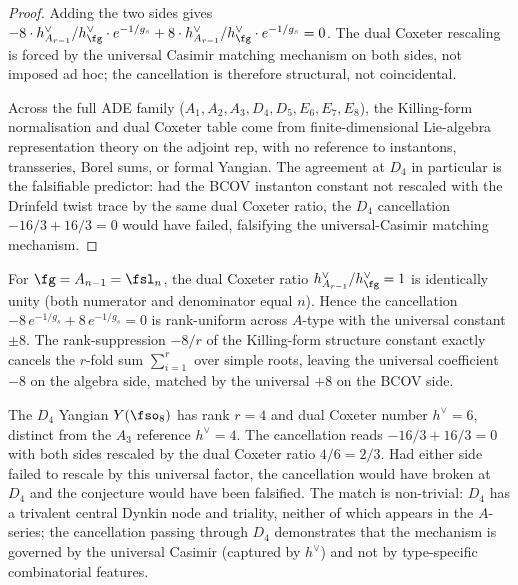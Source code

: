 \begin{proof}
Adding the two sides gives $-8 \cdot h^\vee_{A_{r - 1}} / h^\vee_\fg
\cdot e^{-1/g_s} + 8 \cdot h^\vee_{A_{r - 1}} / h^\vee_\fg \cdot
e^{-1/g_s} = 0$. The dual Coxeter rescaling is forced by the universal
Casimir matching mechanism on both sides, not imposed ad hoc; the
cancellation is therefore structural, not coincidental.

Across the full ADE family \textup{(}$A_1, A_2, A_3, D_4,
D_5, E_6, E_7, E_8$\textup{)}, the Killing-form
normalisation and dual Coxeter table come from finite-dimensional
Lie-algebra representation theory on the adjoint rep, with no reference
to instantons, transseries, Borel sums, or formal Yangian. The
agreement at $D_4$ in particular is the falsifiable predictor: had the
BCOV instanton constant not rescaled with the Drinfeld twist trace by
the same dual Coxeter ratio, the $D_4$ cancellation $-16/3 + 16/3 = 0$
would have failed, falsifying the universal-Casimir matching mechanism.
\end{proof}

\begin{remark}
\label{rem:Yfg-non-formal-rank-uniform-A}
For $\fg = A_{n - 1} = \fsl_n$, the dual Coxeter ratio $h^\vee_{A_{r -
1}} / h^\vee_\fg = 1$ is identically unity \textup{(}both numerator and
denominator equal $n$\textup{).} Hence the cancellation $-8\, e^{-1/g_s}
+ 8\, e^{-1/g_s} = 0$ is rank-uniform across $A$-type with the universal
constant $\pm 8$. The rank-suppression $-8/r$ of the Killing-form
structure constant exactly cancels the $r$-fold sum
$\sum_{i = 1}^{r}$ over simple roots, leaving the universal coefficient
$-8$ on the algebra side, matched by the universal $+8$ on the BCOV
side.
\end{remark}

\begin{remark}
\label{rem:Yfg-non-formal-D4-falsifiable}
The $D_4$ Yangian $Y(\fso_8)$ has rank $r = 4$ and dual Coxeter number
$h^\vee = 6$, distinct from the $A_3$ reference $h^\vee = 4$. The
cancellation reads $-16/3 + 16/3 = 0$ with both sides rescaled by the
dual Coxeter ratio $4/6 = 2/3$. Had either side failed to rescale by
this universal factor, the cancellation would have broken at $D_4$ and
the conjecture would have been falsified. The match is non-trivial:
$D_4$ has a trivalent central Dynkin node and triality, neither of
which appears in the $A$-series; the cancellation passing through $D_4$
demonstrates that the mechanism is governed by the universal Casimir
\textup{(}captured by $h^\vee$\textup{)} and not by type-specific
combinatorial features.
\end{remark}

